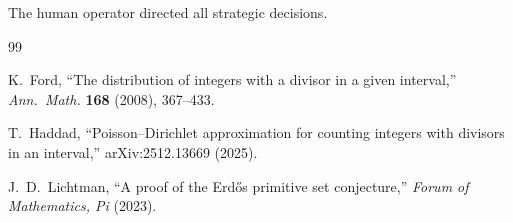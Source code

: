 \documentclass[11pt,a4paper]{article}
\theoremstyle{definition}
\begin{document}
The human operator directed all strategic decisions.

\begin{thebibliography}{99}

K.~Ford, ``The distribution of integers with a divisor in a given 
interval,'' \emph{Ann.\ Math.} \textbf{168} (2008), 367--433.

T.~Haddad, ``Poisson--Dirichlet approximation for counting integers 
with divisors in an interval,'' arXiv:2512.13669 (2025).

J.~D.~Lichtman, ``A proof of the Erd\H{o}s primitive set conjecture,'' 
\emph{Forum of Mathematics, Pi} (2023).

\end{thebibliography}
\end{document}
